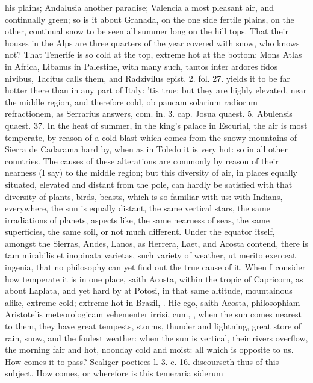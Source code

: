 {his plains; Andalusia another paradise; Valencia a most pleasant air,
and continually green; so is it about Granada, on the one side
fertile plains, on the other, continual snow to be seen all summer long
on the hill tops. That their houses in the Alps are three quarters of
the year covered with snow, who knows not? That Tenerife is so cold at
the top, extreme hot at the bottom: Mons Atlas in Africa, Libanus in
Palestine, with many such, tantos inter ardores fidos nivibus,
Tacitus calls them, and Radzivilus epist. 2. fol. 27. yields it
to be far hotter there than in any part of Italy: 'tis true; but they
are highly elevated, near the middle region, and therefore cold, ob
paucam solarium radiorum refractionem, as Serrarius answers, com. in.
3. cap. Josua quaest. 5. Abulensis quaest. 37. In the heat of summer,
in the king's palace in Escurial, the air is most temperate, by reason
of a cold blast which comes from the snowy mountains of Sierra de
Cadarama hard by, when as in Toledo it is very hot: so in all other
countries. The causes of these alterations are commonly by reason of
their nearness (I say) to the middle region; but this diversity of air,
in places equally situated, elevated and distant from the pole, can
hardly be satisfied with that diversity of plants, birds, beasts, which
is so familiar with us: with Indians, everywhere, the sun is equally
distant, the same vertical stars, the same irradiations of planets,
aspects like, the same nearness of seas, the same superficies, the same
soil, or not much different. Under the equator itself, amongst the
Sierras, Andes, Lanos, as Herrera, Laet, and Acosta contend,
there is tam mirabilis et inopinata varietas, such variety of weather,
ut merito exerceat ingenia, that no philosophy can yet find out the
true cause of it. When I consider how temperate it is in one place,
saith Acosta, within the tropic of Capricorn, as about Laplata,
and yet hard by at Potosi, in that same altitude, mountainous alike,
extreme cold; extreme hot in Brazil, \etc{}. Hic ego, saith Acosta,
philosophiam Aristotelis meteorologicam vehementer irrisi, cum, \etc{},
when the sun comes nearest to them, they have great tempests, storms,
thunder and lightning, great store of rain, snow, and the foulest
weather: when the sun is vertical, their rivers overflow, the morning
fair and hot, noonday cold and moist: all which is opposite to us. How
comes it to pass? Scaliger poetices l. 3. c. 16. discourseth thus of
this subject. How comes, or wherefore is this temeraria siderum
}
